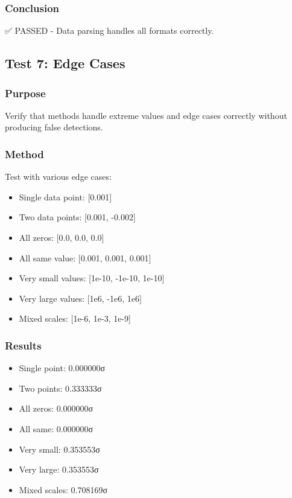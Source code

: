 \subsubsection{Conclusion}
✅ PASSED - Data parsing handles all formats correctly.

\subsection{Test 7: Edge Cases}

\subsubsection{Purpose}
Verify that methods handle extreme values and edge cases correctly without producing false detections.

\subsubsection{Method}
Test with various edge cases:
\begin{itemize}
    \item Single data point: [0.001]
    \item Two data points: [0.001, -0.002]
    \item All zeros: [0.0, 0.0, 0.0]
    \item All same value: [0.001, 0.001, 0.001]
    \item Very small values: [1e-10, -1e-10, 1e-10]
    \item Very large values: [1e6, -1e6, 1e6]
    \item Mixed scales: [1e-6, 1e-3, 1e-9]
\end{itemize}

\subsubsection{Results}
\begin{itemize}
    \item Single point: 0.000000σ
    \item Two points: 0.333333σ
    \item All zeros: 0.000000σ
    \item All same: 0.000000σ
    \item Very small: 0.353553σ
    \item Very large: 0.353553σ
    \item Mixed scales: 0.708169σ
\end{itemize}

